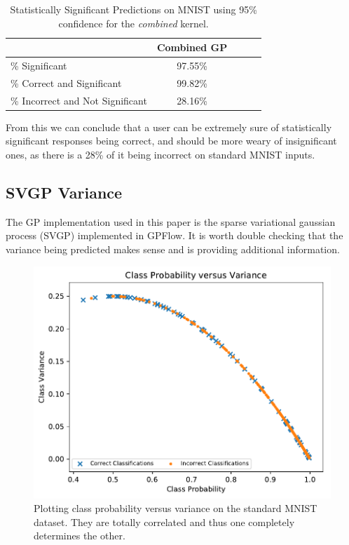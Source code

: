 \documentclass{article}
\begin{document}
\begin{table}[h]
\caption{Statistically Significant Predictions on MNIST using 95\% confidence for the \textit{combined} kernel.}
\vskip 0.15in
\begin{center}
\begin{small}
\begin{sc}
\begin{tabular}{lcccr}
\toprule
							&  Combined GP 	\\
\midrule
\% Significant				& 97.55\%		\\
\% Correct and Significant  & 99.82\%  		\\
\% Incorrect and Not Significant & 28.16\% \\
\bottomrule
\end{tabular}
\end{sc}
\end{small}
\end{center}
\vskip -0.1in
\label{tab:statsig}
\end{table}

From this we can conclude that a user can be extremely sure of statistically significant responses being correct, and should be more weary of insignificant ones, as there is a 28\% of it being incorrect on standard MNIST inputs.

\subsection{SVGP Variance}
\label{sec:svgp-variance}
The GP implementation used in this paper is the sparse variational gaussian process (SVGP) implemented in GPFlow. It is worth double checking that the variance being predicted makes sense and is providing additional information.

\begin{figure}[hbt]
\centering
\includegraphics[width=\hsize]{figures/mnist/mu_versus_var_combined.pdf}
\caption{Plotting class probability versus variance on the standard MNIST dataset. They are totally correlated and thus one completely determines the other.}
\label{fig:all_variances}
\end{figure}
\end{document}
